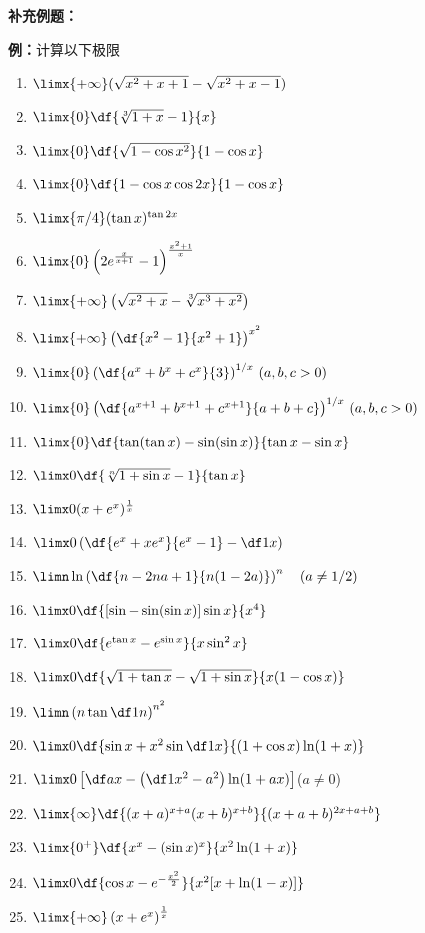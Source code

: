 {\bf 补充例题：}

{\bf 例：}计算以下极限
\begin{enumerate}[(1)]
  \setlength{\itemindent}{1cm}
  \item $\limx{+\infty}(\sqrt{x^2+x+1}-\sqrt{x^2+x-1})$ 
  \item $\limx{0}\df{\sqrt[3]{1+x}-1}{x}$ 
  \item $\limx{0}\df{\sqrt{1-\cos x^2}}{1-\cos x}$ 
  \item $\limx{0}\df{1-\cos x\cos 2x}{1-\cos x}$
  \item $\limx{\pi /4}(\tan x)^{\tan 2x}$ 
  \item $\limx{0}\left(2e^{\frac{x}{x+1}}-1\right)^{\frac{x^2+1}{x}}$ 
  \item $\limx{+\infty}\left(\sqrt{x^2+x}-\sqrt[3]{x^3+x^2}\right)$ 
  \item $\limx{+\infty}\left(\df{x^2-1}{x^2+1}\right)^{x^2}$
  \item $\limx{0}\left(\df{a^x+b^x+c^x}{3}\right)^{1/x}\,(a,b,c>0)$ 
  \item $\limx{0}\left(\df{a^{x+1}+b^{x+1}+c^{x+1}}{a+b+c}\right)^{1/x}
  \,(a,b,c>0)$ 
  \item $\limx{0}\df{\tan(\tan x)-\sin(\sin x)}{\tan x-\sin x}$
  \item $\limx0\df{\sqrt[n]{1+\sin x}-1}{\tan x}$
  \item $\limx0(x+e^x)^{\frac1x}$
  \item $\limx0\left(\df{e^x+xe^x}{e^x-1}-\df1x\right)$
  \item $\limn\ln\left(\df{n-2na+1}{n(1-2a)}\right)^n\quad(a\ne1/2)$
  \item $\limx0\df{[\sin-\sin(\sin x)]\sin x}{x^4}$
  \item $\limx0\df{e^{\tan x}-e^{\sin x}}{x\sin^2x}$
  \item $\limx0\df{\sqrt{1+\tan x}-\sqrt{1+\sin x}}{x(1-\cos x)}$
  \item $\limn\left(n\tan\df1n\right)^{n^2}$
  \item $\limx0\df{\sin x+x^2\sin\df1x}{(1+\cos x)\ln(1+x)}$
  \item $\limx0\left[\df
  ax-\left(\df1{x^2}-a^2\right)\ln(1+ax)\right]$\quad($a\ne 0$)
  \item $\limx{\infty}\df{(x+a)^{x+a}(x+b)^{x+b}}{(x+a+b)^{2x+a+b}}$
  \item $\limx{0^+}\df{x^x-(\sin x)^x}{x^2\ln(1+x)}$
  \item $\limx0\df{\cos x-e^{-\frac{x^2}2}}{x^2[x+\ln(1-x)]}$
  \item $\limx{+\infty}\left(x+e^x\right)^{\frac1x}$

\end{enumerate}
